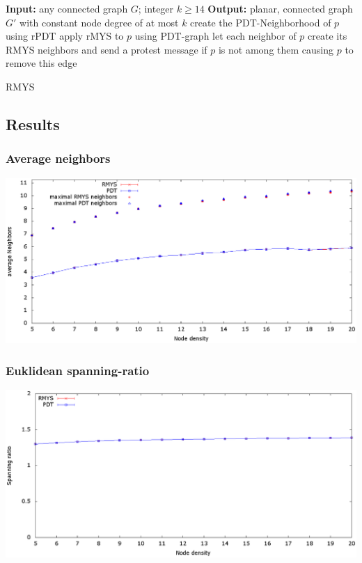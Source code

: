 \documentclass[compress]{beamer}
\begin{document}
\begin{frame}
\begin{algorithm}[H]
\begin{algorithmic}[0]
\STATE \textbf{Input:} any connected graph $G $; integer $k\geq 14 $
\STATE \textbf{Output:} planar, connected graph $G' $ with constant node degree of at most $k $
\STATE create the PDT-Neighborhood of $p $ using rPDT
\STATE apply rMYS to $p $ using PDT-graph
\STATE let each neighbor of $p $ create its RMYS neighbors and send a protest message if $p $ is not among them causing $p $ to remove this edge
\ENDFOR
\end{algorithmic}
\caption{RMYS}
\end{algorithm}
\end{frame}


\subsection{Results}

\begin{frame} 
\frametitle{Average neighbors}
\center	\includegraphics[width=1.0\linewidth]{RMYS_PDT_avrNeighbors.eps}
\end{frame}

\begin{frame} 
\frametitle{Euklidean spanning-ratio}
\center	\includegraphics[width=1.0\linewidth]{RMYS_PDT_SpanningRatio.eps}
\end{frame}
\end{document}
